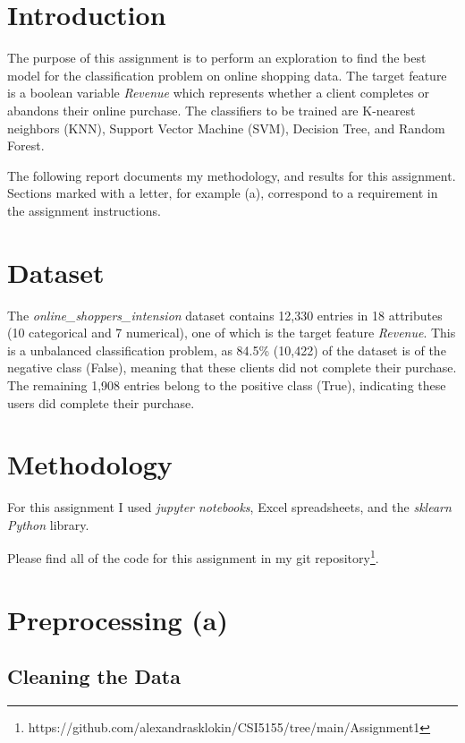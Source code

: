 \documentclass{article}
\begin{document}
\tableofcontents
\newpage

\section{Introduction}

The purpose of this assignment is to perform an exploration to find the best model for the classification problem on online shopping data. The target feature is a boolean variable \emph{Revenue} which represents whether a client completes or abandons their online purchase. The classifiers to be trained are K-nearest neighbors (KNN), Support Vector Machine (SVM), Decision Tree, and Random Forest. 

The following report documents my methodology, and results for this assignment. Sections marked with a letter, for example (a), correspond to a requirement in the assignment instructions.

\section{Dataset}

The \emph{online\_shoppers\_intension} dataset contains 12,330 entries in 18 attributes (10 categorical and 7 numerical), one of which is the target feature \emph{Revenue}. This is a unbalanced classification problem, as 84.5\% (10,422) of the dataset is of the negative class (False), meaning that these clients did not complete their purchase. The remaining 1,908 entries belong to the positive class (True), indicating these users did complete their purchase.

\section{Methodology}

For this assignment I used \emph{jupyter notebooks}, Excel spreadsheets, and the \emph{sklearn Python} library.

Please find all of the code for this assignment in my git repository\footnote{https://github.com/alexandrasklokin/CSI5155/tree/main/Assignment1}.

\section{Preprocessing (a)}

\subsection{Cleaning the Data}
\end{document}
